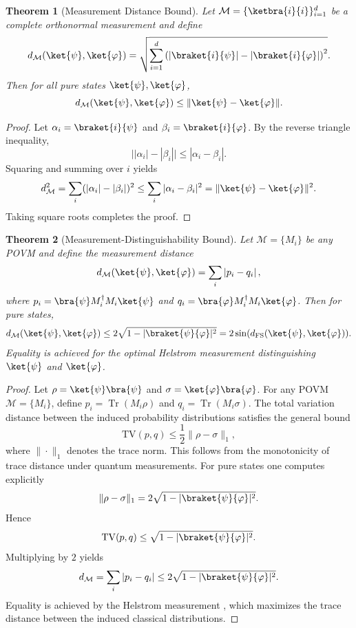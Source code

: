 \documentclass[aps,pra,reprint,nofootinbib,showpacs,superscriptaddress]{revtex4-1}
\newtheorem{theorem}{Theorem}[section]
\begin{document}
\begin{theorem}[Measurement Distance Bound]
\label{thm:measurement-bound}
Let $\mathcal{M} = \{\ketbra{i}{i}\}_{i=1}^d$ be a complete orthonormal measurement and define
\[
d_{\mathcal{M}}(\ket{\psi},\ket{\varphi})
=
\sqrt{\sum_{i=1}^d 
\left(|\braket{i}{\psi}| - |\braket{i}{\varphi}|\right)^2 }.
\]
Then for all pure states $\ket{\psi},\ket{\varphi}$,
\[
d_{\mathcal{M}}(\ket{\psi},\ket{\varphi})
\le
\|\ket{\psi}-\ket{\varphi}\|.
\]
\end{theorem}


\begin{proof}
Let $\alpha_i = \braket{i}{\psi}$ and $\beta_i = \braket{i}{\varphi}$.
By the reverse triangle inequality,
\[
\big||\alpha_i| - |\beta_i|\big|
\le
|\alpha_i - \beta_i|.
\]
Squaring and summing over $i$ yields
\[
d_{\mathcal{M}}^2
=
\sum_i (|\alpha_i| - |\beta_i|)^2
\le
\sum_i |\alpha_i - \beta_i|^2
=
\|\ket{\psi}-\ket{\varphi}\|^2.
\]
Taking square roots completes the proof.
\end{proof}


\begin{theorem}[Measurement-Distinguishability Bound]
\label{thm:measurement-fs}
Let $\mathcal{M} = \{M_i\}$ be any POVM and define the measurement distance
\[
d_{\mathcal{M}}(\ket{\psi},\ket{\varphi})
=
\sum_i \left| p_i - q_i \right|,
\]
where
$p_i = \bra{\psi}M_i^\dagger M_i\ket{\psi}$ and
$q_i = \bra{\varphi}M_i^\dagger M_i\ket{\varphi}$.
Then for pure states,
\[
d_{\mathcal{M}}(\ket{\psi},\ket{\varphi})
\le
2 \sqrt{1 - |\braket{\psi}{\varphi}|^2}
=
2 \sin(d_{\mathrm{FS}}(\ket{\psi},\ket{\varphi})).
\]
Equality is achieved for the optimal Helstrom measurement distinguishing
$\ket{\psi}$ and $\ket{\varphi}$.
\end{theorem}

\begin{proof}
Let $\rho = \ket{\psi}\bra{\psi}$ and
$\sigma = \ket{\varphi}\bra{\varphi}$.
For any POVM $\mathcal M = \{M_i\}$, define
$p_i = \operatorname{Tr}(M_i \rho)$ and
$q_i = \operatorname{Tr}(M_i \sigma)$.
The total variation distance between the induced
probability distributions satisfies the general bound
\[
\mathrm{TV}(p,q)
\le
\frac12 \|\rho - \sigma\|_1,
\]
where $\|\cdot\|_1$ denotes the trace norm.
This follows from the monotonicity of trace distance
under quantum measurements.
For pure states one computes explicitly
\[
\|\rho - \sigma\|_1
=
2\sqrt{1 - |\braket{\psi}{\varphi}|^2}.
\]
Hence
\[
\mathrm{TV}(p,q)
\le
\sqrt{1 - |\braket{\psi}{\varphi}|^2}.
\]
Multiplying by $2$ yields
\[
d_{\mathcal M}
=
\sum_i |p_i - q_i|
\le
2\sqrt{1 - |\braket{\psi}{\varphi}|^2}.
\]
Equality is achieved by the Helstrom measurement \cite{helstrom1969quantum},
which maximizes the trace distance between the induced
classical distributions.
\end{proof}
\end{document}
